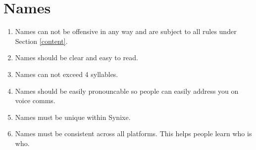 \documentclass[10pt,a4paper]{article}
\begin{document}
\section{Names}
\begin{enumerate}
	\item Names can not be offensive in any way and are subject to all rules under Section \ref{content}.
	\item Names should be clear and easy to read.
	\item Names can not exceed 4 syllables.
	\item Names should be easily pronouncable so people can easily address you on voice comms.
	\item Names must be unique within Synixe.
	\item Names must be consistent across all platforms. This helps people learn who is who.
\end{enumerate}
\end{document}
